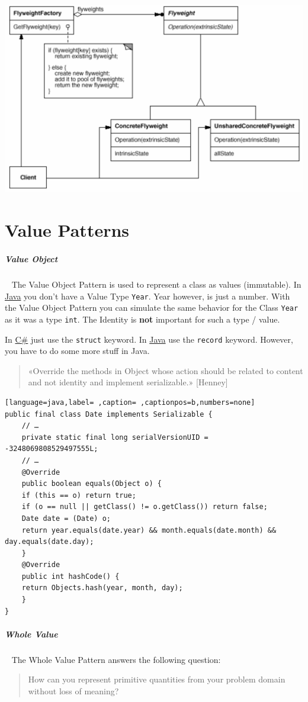 \documentclass[11pt,twoside,landscape]{article}
\begin{document}
\begin{multicols}{3}
{
\begin{center}
\includegraphics[width=.9\linewidth]{img/flyweight.png}
\end{center}
\label{fig:flyweight-class-diagram}
}
\section{Value Patterns}
\label{sec:org622c666}
\subparagraph{Value Object} \
\label{sec:org9c950b5}
The Value Object Pattern is used to represent a class as values (immutable).
In \href{../../../roam/20201116150053-java.org}{Java} you don't have a Value Type \texttt{Year}.
Year however, is just a number.
With the Value Object Pattern you can simulate the same behavior for the Class \texttt{Year} as it was a type \texttt{int}.
The Identity is \textbf{not} important for such a type / value.


In \href{../../../roam/20211003114158-c.org}{C\#} just use the \texttt{struct} keyword.
In \href{../../../roam/20201116150053-java.org}{Java} use the \texttt{record} keyword.
However, you have to do some more stuff in Java.

\begin{quote}
«Override the methods in Object whose action should be related to content and not
identity and implement serializable.» [Henney]
\end{quote}

\begin{lstlisting}[language=java,label= ,caption= ,captionpos=b,numbers=none]
public final class Date implements Serializable {
    // …
    private static final long serialVersionUID = -3248069808529497555L;
    // …
    @Override
    public boolean equals(Object o) {
	if (this == o) return true;
	if (o == null || getClass() != o.getClass()) return false;
	Date date = (Date) o;
	return year.equals(date.year) && month.equals(date.month) && day.equals(date.day);
    }
    @Override
    public int hashCode() {
	return Objects.hash(year, month, day);
    }
}
\end{lstlisting}
\subparagraph{Whole Value} \
\label{sec:org3484a6d}
The Whole Value Pattern answers the following question:
\begin{quote}
How can you represent primitive quantities from your problem domain without loss
of meaning?


\end{quote}
\end{multicols}
\end{document}
